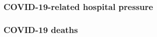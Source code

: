 \subsubsection{COVID-19-related hospital pressure}
\label{hosp}
 

\subsubsection{COVID-19 deaths}
 

